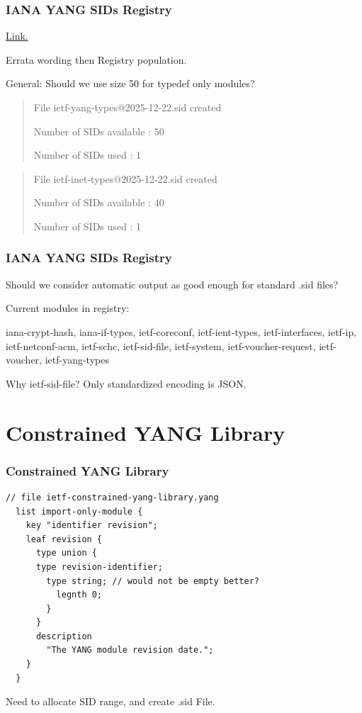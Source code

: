 \documentclass[aspectratio=169]{beamer}
\begin{document}
\begin{frame}
  \frametitle{IANA YANG SIDs Registry}
  \href{https://www.iana.org/assignments/yang-sid/yang-sid.xhtml}{Link.}

  Errata wording then Registry population.

  General: Should we use size 50 for typedef only modules?

  \vspace{0.3em}
  \begin{quote}
    File ietf-yang-types@2025-12-22.sid created

    Number of SIDs available : 50

      Number of SIDs used : 1
  \end{quote}

  \vspace{1em}
  \begin{quote}
    File ietf-inet-types@2025-12-22.sid created

    Number of SIDs available : 40

    Number of SIDs used : 1
  \end{quote}
\end{frame}

\begin{frame}
  \frametitle{IANA YANG SIDs Registry}

  Should we consider automatic output as good enough for standard .sid files?

  \vspace{1em}
  Current modules in registry: 

    iana-crypt-hash, iana-if-types, ietf-coreconf, ietf-ient-types, ietf-interfaces,
    ietf-ip, ietf-netconf-acm, ietf-schc, ietf-sid-file, ietf-system,
    ietf-voucher-request, ietf-voucher, ietf-yang-types

  \vspace{1em} 
  Why ietf-sid-file? Only standardized encoding is JSON.
\end{frame}

\section{Constrained YANG Library}
\begin{frame}[fragile]
  \frametitle{Constrained YANG Library}

\begin{verbatim}
// file ietf-constrained-yang-library.yang
  list import-only-module {
    key "identifier revision";
    leaf revision {
      type union {
      type revision-identifier;
        type string; // would not be empty better?
          legnth 0;
        }
      }
      description
        "The YANG module revision date.";
    }
  }
\end{verbatim}

  Need to allocate SID range, and create .sid File.
\end{frame}
\end{document}
